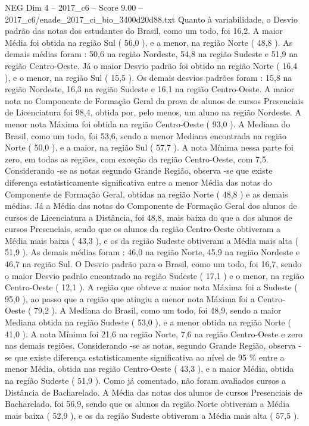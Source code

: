 \begin{textsample}{NEG Dim 4 – 2017\_c6 – Score 9.00 – 2017\_c6/enade\_2017\_ci\_bio\_3400d20d88.txt}
Quanto à variabilidade, o Desvio padrão das notas dos estudantes do Brasil, como um todo, foi 16,2.
A maior Média foi obtida na região Sul ( 56,0 ), e a menor, na região Norte ( 48,8 ).
As demais médias foram : 50,6 na região Nordeste, 54,8 na região Sudeste e 51,9 na região Centro-Oeste.
Já o maior Desvio padrão foi obtido na região Norte ( 16,4 ), e o menor, na região Sul ( 15,5 ).
Os demais desvios padrões foram : 15,8 na região Nordeste, 16,3 na região Sudeste e 16,1 na região Centro-Oeste.
A maior nota no Componente de Formação Geral da prova de alunos de cursos Presenciais de Licenciatura foi 98,4, obtida por, pelo menos, um aluno na região Nordeste.
A menor nota Máxima foi obtida na região Centro-Oeste ( 93,0 ).
A Mediana do Brasil, como um todo, foi 53,6, sendo a menor Mediana encontrada na região Norte ( 50,0 ), e a maior, na região Sul ( 57,7 ).
A nota Mínima nessa parte foi zero, em todas as regiões, com exceção da região Centro-Oeste, com 7,5.
Considerando -se as notas segundo Grande Região, observa -se que existe diferença estatisticamente significativa entre a menor Média das notas do Componente de Formação Geral, obtidas na região Norte ( 48,8 ) e as demais médias.
Já a Média das notas do Componente de Formação Geral dos alunos de cursos de Licenciatura a Distância, foi 48,8, mais baixa do que a dos alunos de cursos Presenciais, sendo que os alunos da região Centro-Oeste obtiveram a Média mais baixa ( 43,3 ), e os da região Sudeste obtiveram a Média mais alta ( 51,9 ).
As demais médias foram : 46,0 na região Norte, 45,9 na região Nordeste e 46,7 na região Sul.
O Desvio padrão para o Brasil, como um todo, foi 16,7, sendo o maior Desvio padrão encontrado na região Sudeste ( 17,1 ) e o menor, na região Centro-Oeste ( 12,1 ).
A região que obteve a maior nota Máxima foi a Sudeste ( 95,0 ), ao passo que a região que atingiu a menor nota Máxima foi a Centro-Oeste ( 79,2 ).
A Mediana do Brasil, como um todo, foi 48,9, sendo a maior Mediana obtida na região Sudeste ( 53,0 ), e a menor obtida na região Norte ( 41,0 ).
A nota Mínima foi 21,6 na região Norte, 7,6 na região Centro-Oeste e zero nas demais regiões.
Considerando -se as notas, segundo Grande Região, observa -se que existe diferença estatisticamente significativa ao nível de 95 \% entre a menor Média, obtida nas região Centro-Oeste ( 43,3 ), e a maior Média, obtida na região Sudeste ( 51,9 ).
Como já comentado, não foram avaliados cursos a Distância de Bacharelado.
A Média das notas dos alunos de cursos Presenciais de Bacharelado, foi 56,9, sendo que os alunos da região Norte obtiveram a Média mais baixa ( 52,9 ), e os da região Sudeste obtiveram a Média mais alta ( 57,5 ).

\end{textsample}
